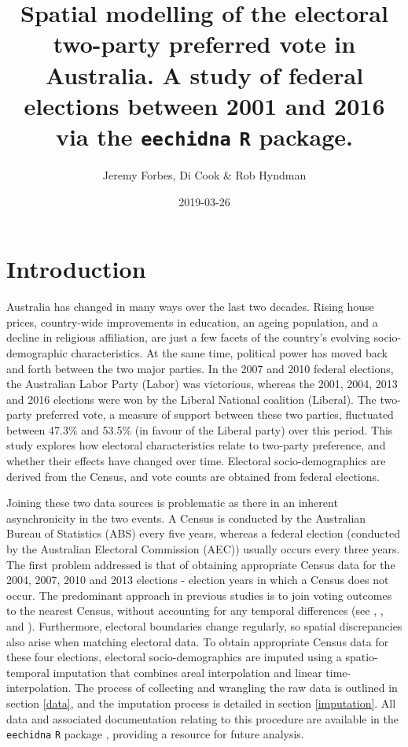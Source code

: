 \documentclass[openany]{book}
\title{Spatial modelling of the electoral two-party preferred vote in Australia. A study of federal elections between 2001 and 2016 via the \texttt{eechidna} \texttt{R} package.}
\author{Jeremy Forbes, Di Cook \& Rob Hyndman}
\date{2019-03-26}
\begin{document}
\maketitle

{
\setcounter{tocdepth}{1}
\tableofcontents
}
\hypertarget{intro}{%
\chapter{Introduction}\label{intro}}

Australia has changed in many ways over the last two decades. Rising house prices, country-wide improvements in education, an ageing population, and a decline in religious affiliation, are just a few facets of the country's evolving socio-demographic characteristics. At the same time, political power has moved back and forth between the two major parties. In the 2007 and 2010 federal elections, the Australian Labor Party (Labor) was victorious, whereas the 2001, 2004, 2013 and 2016 elections were won by the Liberal National coalition (Liberal). The two-party preferred vote, a measure of support between these two parties, fluctuated between 47.3\% and 53.5\% (in favour of the Liberal party) over this period. This study explores how electoral characteristics relate to two-party preference, and whether their effects have changed over time. Electoral socio-demographics are derived from the Census, and vote counts are obtained from federal elections.

Joining these two data sources is problematic as there in an inherent asynchronicity in the two events. A Census is conducted by the Australian Bureau of Statistics (ABS) every five years, whereas a federal election (conducted by the Australian Electoral Commission (AEC)) usually occurs every three years. The first problem addressed is that of obtaining appropriate Census data for the 2004, 2007, 2010 and 2013 elections - election years in which a Census does not occur. The predominant approach in previous studies is to join voting outcomes to the nearest Census, without accounting for any temporal differences (see \citet{DavisStimson98}, \citet{Stimson06}, \citet{Liao09} and \citet{Stimson09}). Furthermore, electoral boundaries change regularly, so spatial discrepancies also arise when matching electoral data. To obtain appropriate Census data for these four elections, electoral socio-demographics are imputed using a spatio-temporal imputation that combines areal interpolation \citep{Goodchild1993} and linear time-interpolation. The process of collecting and wrangling the raw data is outlined in section \ref{data}, and the imputation process is detailed in section \ref{imputation}. All data and associated documentation relating to this procedure are available in the \texttt{eechidna} \texttt{R} package \citep{eechidna}, providing a resource for future analysis.
\end{document}
